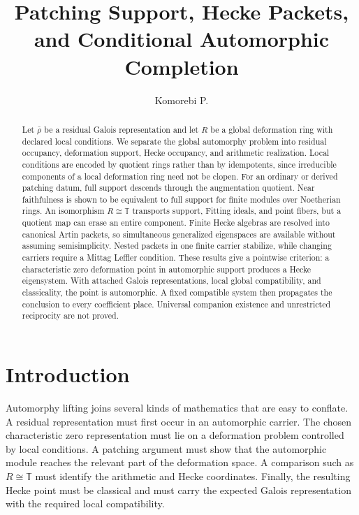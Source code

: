 \documentclass{aomart}
\title[Patching support and automorphic completion]{Patching Support, Hecke Packets, and Conditional Automorphic Completion}
\author[Komorebi P.]{Komorebi P.}
\theoremstyle{definition}
\theoremstyle{remark}
\newcommand{\TT}{\mathbb T}
\begin{document}
\begin{abstract}
Let \(\bar\rho\) be a residual Galois representation and let \(R\) be a global deformation ring with declared local conditions. We separate the global automorphy problem into residual occupancy, deformation support, Hecke occupancy, and arithmetic realization. Local conditions are encoded by quotient rings rather than by idempotents, since irreducible components of a local deformation ring need not be clopen. For an ordinary or derived patching datum, full support descends through the augmentation quotient. Near faithfulness is shown to be equivalent to full support for finite modules over Noetherian rings. An isomorphism \(R\cong\TT\) transports support, Fitting ideals, and point fibers, but a quotient map can erase an entire component. Finite Hecke algebras are resolved into canonical Artin packets, so simultaneous generalized eigenspaces are available without assuming semisimplicity. Nested packets in one finite carrier stabilize, while changing carriers require a Mittag Leffler condition. These results give a pointwise criterion: a characteristic zero deformation point in automorphic support produces a Hecke eigensystem. With attached Galois representations, local global compatibility, and classicality, the point is automorphic. A fixed compatible system then propagates the conclusion to every coefficient place. Universal companion existence and unrestricted reciprocity are not proved.
\end{abstract}
\maketitle
\thispagestyle{plain}

\section{Introduction}\label{sec:introduction}

Automorphy lifting joins several kinds of mathematics that are easy to conflate. A residual representation must first occur in an automorphic carrier. The chosen characteristic zero representation must lie on a deformation problem controlled by local conditions. A patching argument must show that the automorphic module reaches the relevant part of the deformation space. A comparison such as \(R\cong\TT\) must identify the arithmetic and Hecke coordinates. Finally, the resulting Hecke point must be classical and must carry the expected Galois representation with the required local compatibility.
\end{document}
